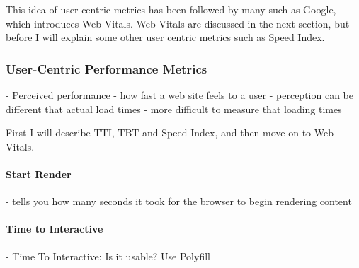 This idea of user centric metrics has been followed by many such as Google, which introduces Web Vitals.
Web Vitals are discussed in the next section, but before I will explain some other user centric metrics such as Speed Index.





\subsubsection{User-Centric Performance Metrics}




- Perceived performance
- how fast a web site feels to a user
- perception can be different that actual load times
- more difficult to measure that loading times








First I will describe TTI, TBT and Speed Index, and then move on to Web Vitals.





\paragraph{Start Render}



- tells you how many seconds it took for the browser to begin rendering content







\paragraph{Time to Interactive}






- Time To Interactive: Is it usable? Use Polyfill




